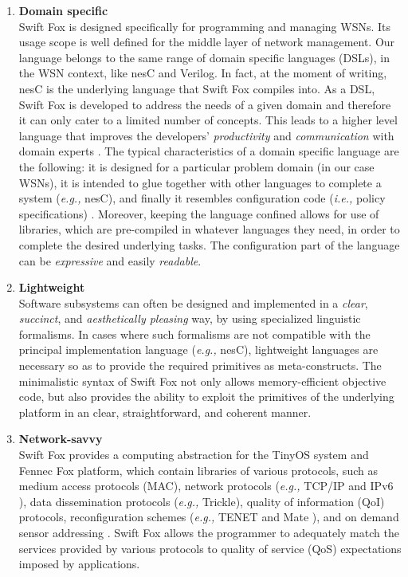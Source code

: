 \documentclass[11pt]{article}
\begin{document}
\begin{enumerate}
	\item \textbf{Domain specific}		\\
	Swift Fox is designed specifically for programming and managing
	WSNs. Its usage scope is well defined for the middle layer of
	network management. Our language belongs to the same range of
	domain specific languages (DSLs), in the WSN context, like nesC and
	Verilog. In fact, at the moment of writing, nesC is the underlying 
	language that Swift Fox compiles into. As a DSL, Swift Fox is
	developed to address the needs of a given domain and therefore it
	can only cater to a limited number of concepts. This leads to a
	higher level language that improves the developers'
	\textit{productivity} and \textit{communication} with domain
	experts \cite{johan:online}. The typical characteristics of a
	domain specific language are the following: it is designed for a
	particular problem domain (in our case WSNs), it is intended to
	glue together with other languages to complete a system
	(\textit{e.g.,} nesC), and finally it resembles configuration code 
	(\textit{i.e.,} policy specifications) \cite{mfowler:online}.
	Moreover, keeping the language confined allows for use of
	libraries, which are pre-compiled in whatever languages they need,
	in order to complete the desired underlying tasks. The
	configuration part of the language can be \textit{expressive} and
	easily \textit{readable}. 

	\item \textbf{Lightweight}		\\
	Software subsystems can often be designed and implemented in a
	\textit{clear}, \textit{succinct}, and \textit{aesthetically
	pleasing} way, by using specialized linguistic formalisms. In cases
	where such formalisms are not compatible with the principal
	implementation language (\textit{e.g.,} nesC), lightweight
	languages \cite{dspinellis:1997} are necessary so as to provide the
	required primitives as meta-constructs. The minimalistic syntax of
	Swift Fox not only allows memory-efficient objective code, but also
	provides the ability to exploit the primitives of the underlying
	platform in an clear, straightforward, and coherent manner.

	\item \textbf{Network-savvy}		\\
	Swift Fox provides a computing abstraction for the TinyOS
	system and Fennec Fox platform, which contain libraries of various 
	protocols, such as medium access protocols (MAC), network protocols
	(\textit{e.g.,} TCP/IP \cite{dunkels:2003} and IPv6
	\cite{durvy:2008}), data dissemination protocols (\textit{e.g.,}
	Trickle\cite{levis:2004}), quality of information (QoI) protocols, 
	reconfiguration schemes (\textit{e.g.,} TENET \cite{gnawali:2006}
	and Mate \cite{levis:2002}), and on demand sensor addressing
	\cite{schurgers:2002}. Swift Fox allows the programmer to
	adequately match the services provided by various protocols to
	quality of service (QoS) expectations imposed by applications.


\end{enumerate}
\end{document}
